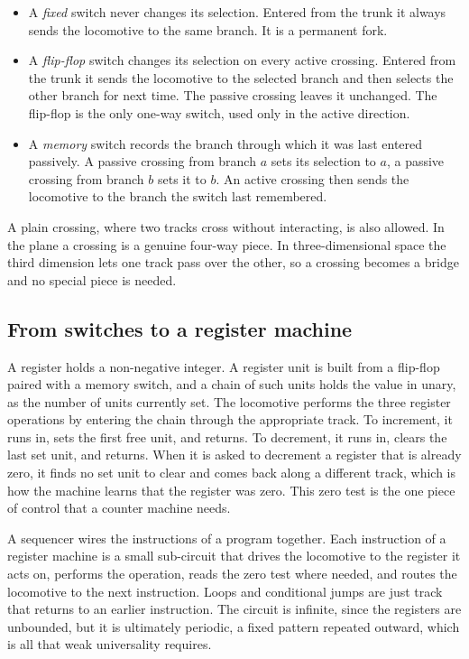 \begin{itemize}
  \item A \emph{fixed} switch never changes its selection. Entered from the trunk it always sends the
  locomotive to the same branch. It is a permanent fork.
  \item A \emph{flip-flop} switch changes its selection on every active crossing. Entered from the trunk it
  sends the locomotive to the selected branch and then selects the other branch for next time. The passive
  crossing leaves it unchanged. The flip-flop is the only one-way switch, used only in the active direction.
  \item A \emph{memory} switch records the branch through which it was last entered passively. A passive
  crossing from branch $a$ sets its selection to $a$, a passive crossing from branch $b$ sets it to $b$. An
  active crossing then sends the locomotive to the branch the switch last remembered.
\end{itemize}

A plain crossing, where two tracks cross without interacting, is also allowed. In the plane a crossing is a
genuine four-way piece. In three-dimensional space the third dimension lets one track pass over the other, so
a crossing becomes a bridge and no special piece is needed.

\subsection{From switches to a register machine}

A register holds a non-negative integer. A register unit is built from a flip-flop paired with a memory
switch, and a chain of such units holds the value in unary, as the number of units currently set. The
locomotive performs the three register operations by entering the chain through the appropriate track. To
increment, it runs in, sets the first free unit, and returns. To decrement, it runs in, clears the last set
unit, and returns. When it is asked to decrement a register that is already zero, it finds no set unit to
clear and comes back along a different track, which is how the machine learns that the register was zero. This
zero test is the one piece of control that a counter machine needs.

A sequencer wires the instructions of a program together. Each instruction of a register machine is a small
sub-circuit that drives the locomotive to the register it acts on, performs the operation, reads the zero test
where needed, and routes the locomotive to the next instruction. Loops and conditional jumps are just track
that returns to an earlier instruction. The circuit is infinite, since the registers are unbounded, but it is
ultimately periodic, a fixed pattern repeated outward, which is all that weak universality requires.

